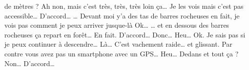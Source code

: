 \begin{dialogue*}
  de mètres ?
  \Req Ah non, mais c'est très, très, très loin ça… Je les vois mais
  c'est pas accessible…
  \Sec {} D'accord…
  \Req … Devant moi y'a des tas de barres rocheuses en fait, je vois
  pas comment je peux arriver jusque-là
  \Sec {} Ok…
  \Req … et en dessous des barres rocheuses ça repart en forêt… En
  fait.
  \Sec D'accord… Donc… Heu… Ok.
  \Req Je sais pas si je peux continuer à descendre… Là… C'est
  vachement raide… et glissant.
  \Sec Par contre vous avez pas un smartphone avec un GPS… Heu… Dedans
  et tout ça ?
  \Req Non…
  \Sec D'accord…
\end{dialogue*}
